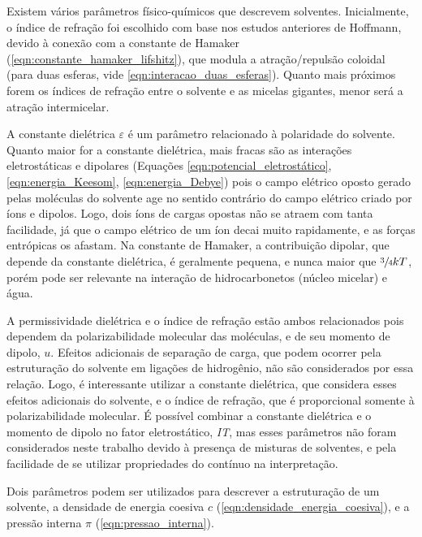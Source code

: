 		Existem vários parâmetros físico-químicos que descrevem solventes. Inicialmente, o índice de refração foi escolhido com base nos estudos anteriores de Hoffmann, devido à conexão com a constante de Hamaker (\autoref{eqn:constante_hamaker_lifshitz}), que modula a atração/repulsão coloidal (para duas esferas, vide \autoref{eqn:interacao_duas_esferas}). Quanto mais próximos forem os índices de refração entre o solvente e as micelas gigantes, menor será a atração intermicelar.  
		
		A constante dielétrica \(\varepsilon\) é um parâmetro relacionado à polaridade do solvente. Quanto maior for a constante dielétrica, mais fracas são as interações eletrostáticas e dipolares (Equações \ref{eqn:potencial_eletrostático}, \ref{eqn:energia_Keesom}, \ref{eqn:energia_Debye}) pois o campo elétrico oposto gerado pelas moléculas do solvente age no sentido contrário do campo elétrico criado por íons e dipolos. Logo, dois íons de cargas opostas não se atraem com tanta facilidade, já que o campo elétrico de um íon decai muito rapidamente, e as forças entrópicas os afastam. Na constante de Hamaker, a contribuição dipolar, que depende da constante dielétrica, é geralmente pequena, e nunca maior que \(\sfrac{3}{4}kT\), porém pode ser relevante na interação de hidrocarbonetos (núcleo micelar) e água.   
		
		A permissividade dielétrica e o índice de refração estão ambos relacionados pois dependem da polarizabilidade molecular das moléculas, e de seu momento de dipolo, \(u\). Efeitos adicionais de separação de carga, que podem ocorrer pela estruturação do solvente em ligações de hidrogênio, não são considerados por essa relação. Logo, é interessante utilizar a constante dielétrica, que considera esses efeitos adicionais do solvente, e o índice de refração, que é proporcional somente à polarizabilidade molecular. É possível combinar a constante dielétrica e o momento de dipolo no fator eletrostático, \emph{IT}, mas esses parâmetros não foram considerados neste trabalho devido à presença de misturas de solventes, e pela facilidade de se utilizar propriedades do contínuo na interpretação.\cite{ReichardtSolvents}
		
		Dois parâmetros podem ser utilizados para descrever a estruturação de um solvente, a densidade de energia coesiva \(c\) (\autoref{eqn:densidade_energia_coesiva}), e a pressão interna \(\pi\) (\autoref{eqn:pressao_interna}). \cite{ReichardtSolvents}
		
